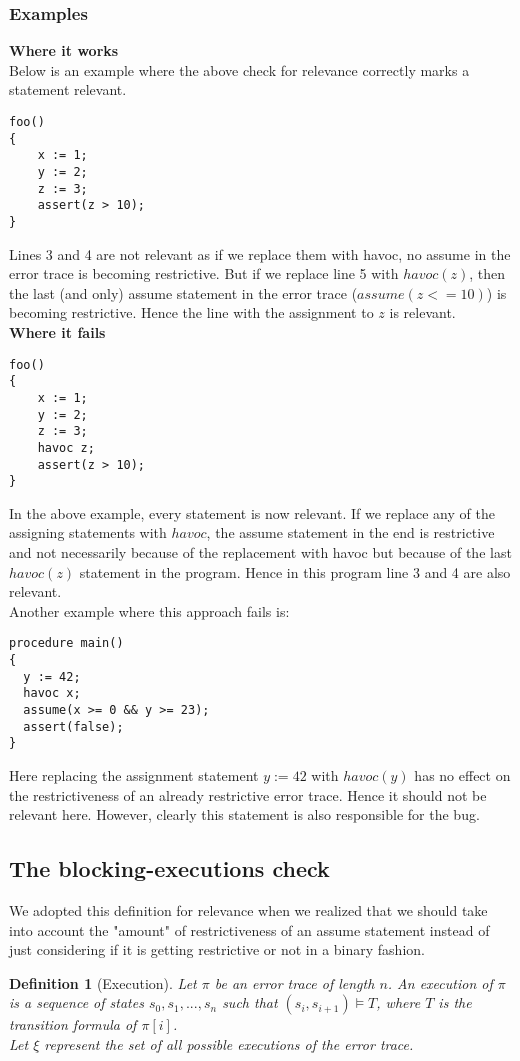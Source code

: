 \documentclass{article}
\newtheorem{mydef}{Definition}
\begin{document}
\subsubsection{Examples}
\textbf{Where it works} \\
Below is an example where the above check for relevance correctly marks a statement relevant.
\begin{lstlisting}
foo()
{
	x := 1;
	y := 2;
	z := 3;
	assert(z > 10);
}
\end{lstlisting}
Lines 3 and 4 are not relevant as if we replace them with havoc, no assume in the error trace is becoming restrictive. But if we replace line 5 with $havoc(z)$, then the last (and only) assume statement in the error trace ($assume(z<=10)$) is becoming restrictive. Hence the line with the assignment to $z$ is relevant. \\
\textbf{Where it fails}
\begin{lstlisting}
foo()
{
	x := 1;
	y := 2;
	z := 3;
	havoc z;
	assert(z > 10);
}
\end{lstlisting}
In the above example, every statement is now relevant. If we replace any of the assigning statements with $havoc$, the assume statement in the end is restrictive and not necessarily because of the replacement with havoc but because of the last $havoc(z)$ statement in the program. Hence in this program line 3 and 4 are also relevant.\\
Another example where this approach fails is:
\begin{lstlisting}
procedure main()
{
  y := 42;
  havoc x;
  assume(x >= 0 && y >= 23);
  assert(false);
}
\end{lstlisting}
Here replacing the assignment statement $y:=42$ with $havoc(y)$ has no effect on the restrictiveness of an already restrictive error trace. Hence it should not be relevant here. However, clearly this statement is also responsible for the bug.

\subsection{The blocking-executions check}
We adopted this definition for relevance when we realized that we should take into account the "amount" of restrictiveness of an assume statement instead of just considering if it is getting restrictive or not in a binary fashion.
\begin{mydef}[Execution]\label{mydef:execution_definition}
Let $\pi$ be an error trace of length $n$. An \emph{execution} of $\pi$ is a sequence of states $s_0, s_1, ..., s_n$ such that $(s_i, s_{i+1}) \models T$, where $T$ is the transition formula of $\pi[i]$. \\
Let $\xi$ represent the set of all possible executions of the error trace.
\end{mydef}
\end{document}
